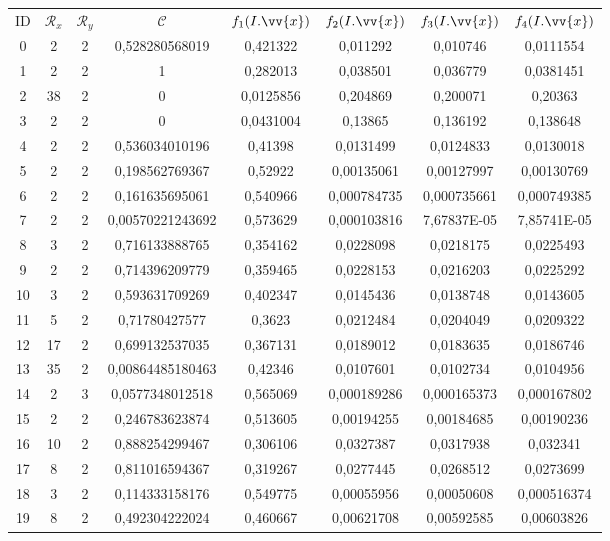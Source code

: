 \scriptsize
\begin{longtable}{|c|c|c|c|c|c|c|c|}
\hline
ID & $\mathscr{R}_x$ & $\mathscr{R}_y$ & $\mathscr{C}$ & $f_1(I.\vv{x})$ & $f_2(I.\vv{x})$ & $f_3(I.\vv{x})$ & $f_4(I.\vv{x})$ \\
0 & 2 & 2 & 0,528280568019 & 0,421322 & 0,011292 & 0,010746 & 0,0111554  \\
1 & 2 & 2 & 1 & 0,282013 & 0,038501 & 0,036779 & 0,0381451  \\
2 & 38 & 2 & 0 & 0,0125856 & 0,204869 & 0,200071 & 0,20363  \\
3 & 2 & 2 & 0 & 0,0431004 & 0,13865 & 0,136192 & 0,138648  \\
4 & 2 & 2 & 0,536034010196 & 0,41398 & 0,0131499 & 0,0124833 & 0,0130018  \\
5 & 2 & 2 & 0,198562769367 & 0,52922 & 0,00135061 & 0,00127997 & 0,00130769  \\
6 & 2 & 2 & 0,161635695061 & 0,540966 & 0,000784735 & 0,000735661 & 0,000749385  \\
7 & 2 & 2 & 0,00570221243692 & 0,573629 & 0,000103816 & 7,67837E-05 & 7,85741E-05  \\
8 & 3 & 2 & 0,716133888765 & 0,354162 & 0,0228098 & 0,0218175 & 0,0225493  \\
9 & 2 & 2 & 0,714396209779 & 0,359465 & 0,0228153 & 0,0216203 & 0,0225292  \\
10 & 3 & 2 & 0,593631709269 & 0,402347 & 0,0145436 & 0,0138748 & 0,0143605  \\
11 & 5 & 2 & 0,71780427577 & 0,3623 & 0,0212484 & 0,0204049 & 0,0209322  \\
12 & 17 & 2 & 0,699132537035 & 0,367131 & 0,0189012 & 0,0183635 & 0,0186746  \\
13 & 35 & 2 & 0,00864485180463 & 0,42346 & 0,0107601 & 0,0102734 & 0,0104956  \\
14 & 2 & 3 & 0,0577348012518 & 0,565069 & 0,000189286 & 0,000165373 & 0,000167802  \\
15 & 2 & 2 & 0,246783623874 & 0,513605 & 0,00194255 & 0,00184685 & 0,00190236  \\
16 & 10 & 2 & 0,888254299467 & 0,306106 & 0,0327387 & 0,0317938 & 0,032341  \\
17 & 8 & 2 & 0,811016594367 & 0,319267 & 0,0277445 & 0,0268512 & 0,0273699  \\
18 & 3 & 2 & 0,114333158176 & 0,549775 & 0,00055956 & 0,00050608 & 0,000516374  \\
19 & 8 & 2 & 0,492304222024 & 0,460667 & 0,00621708 & 0,00592585 & 0,00603826  \\

\end{longtable}
